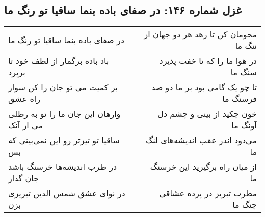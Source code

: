 \begin{center}
\section*{غزل شماره ۱۴۶: در صفای باده بنما ساقیا تو رنگ ما}
\label{sec:0146}
\begin{longtable}{l p{0.5cm} r}
در صفای باده بنما ساقیا تو رنگ ما
&&
محومان کن تا رهد هر دو جهان از ننگ ما
\\
باد باده برگمار از لطف خود تا برپرد
&&
در هوا ما را که تا خفت پذیرد سنگ ما
\\
بر کمیت می تو جان را کن سوار راه عشق
&&
تا چو یک گامی بود بر ما دو صد فرسنگ ما
\\
وارهان این جان ما را تو به رطلی می از آنک
&&
خون چکید از بینی و چشم دل آونگ ما
\\
ساقیا تو تیزتر رو این نمی‌بینی که بس
&&
می‌دود اندر عقب اندیشه‌های لنگ ما
\\
در طرب اندیشه‌ها خرسنگ باشد جان گداز
&&
از میان راه برگیرید این خرسنگ ما
\\
در نوای عشق شمس الدین تبریزی بزن
&&
مطرب تبریز در پرده عشاقی چنگ ما
\\
\end{longtable}
\end{center}
